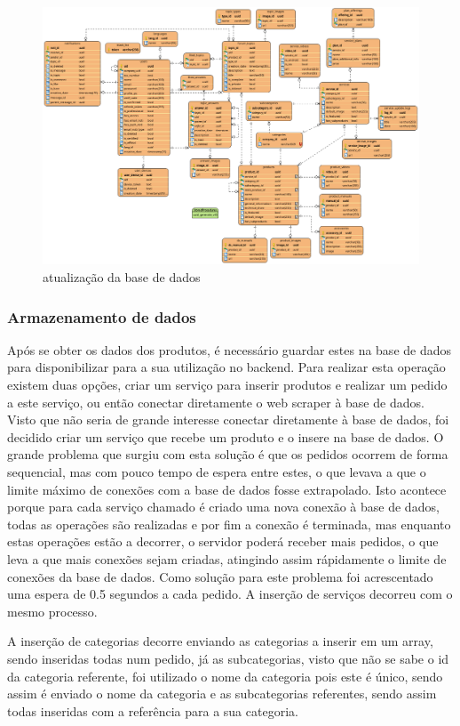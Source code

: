 \begin{figure}[htb]
    \centering
    \includegraphics[width=\textwidth]{images/diagramas/bd_final.png}
    \caption{atualização da base de dados}
    \label{fig:63}
\end{figure}

\newpage

\subsubsection{Armazenamento de dados}

Após se obter os dados dos produtos, é necessário guardar estes na base de dados para disponibilizar para a sua utilização no backend. Para realizar
esta operação existem duas opções, criar um serviço para inserir produtos e realizar um pedido a este serviço, ou então conectar diretamente
o web scraper à base de dados. Visto que não seria de grande interesse conectar diretamente à base de dados, foi decidido criar um serviço que recebe um produto e o 
insere na base de dados. O grande problema que surgiu com esta solução é que os pedidos ocorrem de forma sequencial, mas com pouco tempo de espera entre estes, o que
levava a que o limite máximo de conexões com a base de dados fosse extrapolado. Isto acontece porque para cada serviço chamado é criado uma nova conexão à base de 
dados, todas as operações são realizadas e por fim a conexão é terminada, mas enquanto estas operações estão a decorrer, o servidor poderá receber mais pedidos, o que 
leva a que mais conexões sejam criadas, atingindo assim rápidamente o limite de conexões da base de dados. Como solução para este problema foi acrescentado uma espera 
de 0.5 segundos a cada pedido. A inserção de serviços decorreu com o mesmo processo.

A inserção de categorias decorre enviando as categorias a inserir em um array, sendo inseridas todas num pedido, já as subcategorias, visto que não se sabe o id da 
categoria referente, foi utilizado o nome da categoria pois este é único, sendo assim é enviado o nome da categoria e as subcategorias referentes, sendo assim todas inseridas
com a referência para a sua categoria.
